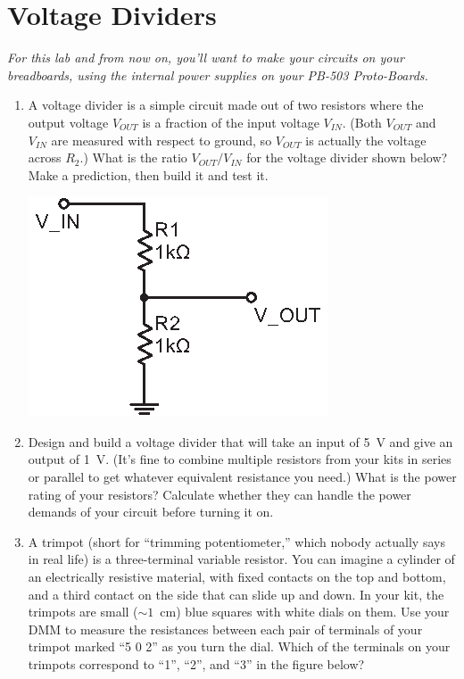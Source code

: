 \section{Voltage Dividers}
\label{lab_voltage_dividers}


\bigskip

\textit{For this lab and from now on, you'll want to make your circuits on your breadboards, using the internal power supplies on your PB-503 Proto-Boards.}

\begin{enumerate}[wide]

\item A voltage divider is a simple circuit made out of two resistors where the output voltage $V_{OUT}$ is a fraction of the input voltage $V_{IN}$.  (Both $V_{OUT}$ and $V_{IN}$ are measured with respect to ground, so $V_{OUT}$ is actually the voltage across $R_2$.)  What is the ratio $V_{OUT}/V_{IN}$ for the voltage divider shown below?  Make a prediction, then build it and test it.
 
\begin{center}
\includegraphics{voltage_dividers/voltage_divider.eps}
\end{center}

\item Design and build a voltage divider that will take an input of 5~V and give an output of 1~V.  (It's fine to combine multiple resistors from your kits in series or parallel to get whatever equivalent resistance you need.)  What is the power rating of your resistors?  Calculate whether they can handle the power demands of your circuit before turning it on. \label{part_five_to_one}

\item A trimpot (short for ``trimming potentiometer,'' which nobody actually says in real life) is a three-terminal variable resistor.  You can imagine a cylinder of an electrically resistive material, with fixed contacts on the top and bottom, and a third contact on the side that can slide up and down.  In your kit, the trimpots are small ($\sim 1$~cm) blue squares with white dials on them.  Use your DMM to measure the resistances between each pair of terminals of your trimpot marked ``5 0 2'' as you turn the dial.  Which of the terminals on your trimpots correspond to ``1'', ``2'', and ``3'' in the figure below?   


\end{enumerate}
